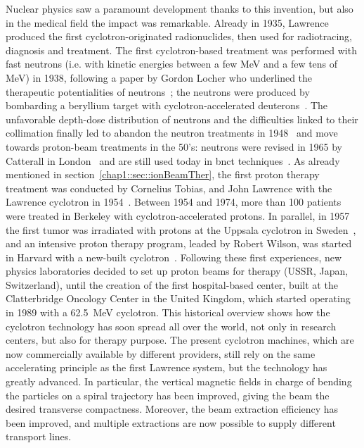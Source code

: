 Nuclear physics saw a paramount development thanks to this invention, but also in the medical field the impact was remarkable. Already in 1935, Lawrence produced the first cyclotron-originated radionuclides, then used for radiotracing, diagnosis and treatment. The first cyclotron-based treatment was performed with fast neutrons (i.e. with kinetic energies between a few MeV and a few tens of MeV) in 1938, following a paper by Gordon Locher who underlined the therapeutic potentialities of neutrons~\parencite{Locher1936}; the neutrons were produced by bombarding a beryllium target with cyclotron-accelerated deuterons~\parencite{Stone1940}. The unfavorable depth-dose distribution of neutrons and the difficulties linked to their collimation finally led to abandon the neutron treatments in 1948~\parencite{Stone1948} and move towards proton-beam treatments in the 50's: neutrons were revised in 1965 by Catterall in London~\parencite{Catterall1971} and are still used today in \gls{bnct} techniques~\parencite{Barth2005, Nedunchezhian2016}. As already mentioned in section~\ref{chap1::sec::ionBeamTher}, the first proton therapy treatment was conducted by Cornelius Tobias,  and John Lawrence with the Lawrence cyclotron in 1954~\parencite{Tobias1955, Tobias1958}. Between 1954 and 1974, more than 100 patients were treated in Berkeley with cyclotron-accelerated protons. In parallel, in 1957 the first tumor was irradiated with protons at the Uppsala cyclotron in Sweden~\parencite{Larsson1962}, and an intensive proton therapy program, leaded by Robert Wilson, was started in Harvard with a new-built cyclotron~\parencite{Wilson2004}. Following these first experiences, new physics laboratories decided to set up proton beams for therapy (USSR, Japan, Switzerland), until the creation of the first hospital-based center, built at the Clatterbridge Oncology Center in the United Kingdom, which started operating in 1989 with a 62.5~MeV cyclotron. This historical overview shows how the cyclotron technology has soon spread all over the world, not only in research centers, but also for therapy purpose. The present cyclotron machines, which are now commercially available by different providers,  still rely on the same accelerating principle as the first Lawrence system, but the technology has greatly advanced.  In particular, the vertical magnetic fields in charge of bending the particles on a spiral trajectory has been improved, giving the beam the desired transverse compactness. Moreover, the beam extraction efficiency has been improved, and multiple extractions are now possible to supply different transport lines.
